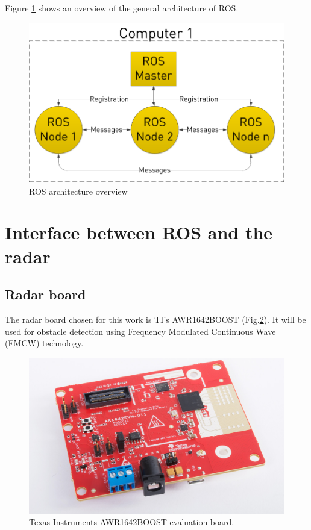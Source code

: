 \documentclass[12pt]{article}
\begin{document}
Figure \ref{fig:ros_concepts} shows an overview of the general architecture of ROS.

\begin{figure}[!htb]
    \centering
    \includegraphics[scale=0.28]{ros_graph.png}
    \caption{ROS architecture overview \cite{rosbasics}}
    \label{fig:ros_concepts}
\end{figure}
\section{Interface between ROS and the radar}
\subsection{Radar board}
The radar board chosen for this work is TI's AWR1642BOOST (Fig.\ref{fig:awr}). It will be used for obstacle detection using Frequency Modulated Continuous Wave (FMCW) technology.
\begin{figure}[!htb]
    \centering
    \includegraphics[scale=1.0]{sensor.jpg}
    \caption{Texas Instruments AWR1642BOOST evaluation board.}
    \label{fig:awr}
\end{figure}
\end{document}
